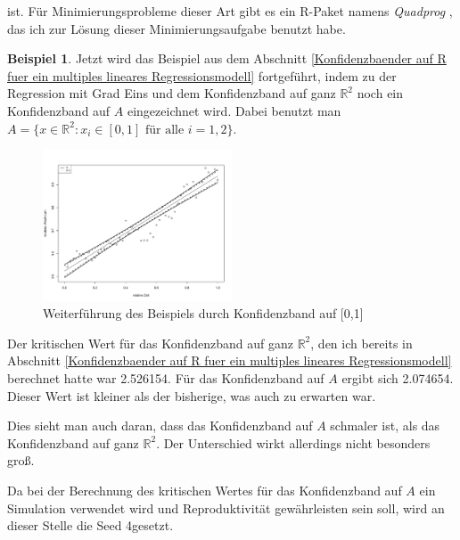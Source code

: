 \documentclass[12pt,a4paper]{article}
\theoremstyle{definition}
\newtheorem{Beispiel}[Definition]{Beispiel}
\theoremstyle{definition}
\theoremstyle{definition}
\newcommand{\cR}{2.526154}
\newcommand{\seedsimulation}{4}
\newcommand{\cA}{2.074654}
\begin{document}
ist. Für Minimierungsprobleme dieser Art gibt es ein R-Paket namens \textit{Quadprog} , das ich zur Lösung dieser Minimierungsaufgabe benutzt habe.

\begin{Beispiel}
Jetzt wird das Beispiel aus dem Abschnitt \ref{Konfidenzbaender auf R fuer ein multiples lineares Regressionsmodell} fortgeführt, indem zu der Regression mit Grad Eins und dem Konfidenzband auf ganz $\mathbb{R}^{2}$ noch ein Konfidenzband auf $A$ eingezeichnet wird. Dabei benutzt man $A = \{x \in \mathbb{R}^2 : x_i \in [0,1] \text{ für alle } i=1, 2 \} $. 


\begin{figure}[H] 
  \centering
     \includegraphics[width=0.5\textwidth]{Bsp-KB-minmax}
  \caption{Weiterführung des Beispiels durch Konfidenzband auf [0,1]}
  \label{KB-minmax-BSP}
\end{figure}

Der kritischen Wert für das Konfidenzband auf ganz $\mathbb{R}^2$, den ich bereits in Abschnitt \ref{Konfidenzbaender auf R fuer ein multiples lineares Regressionsmodell} berechnet hatte war \cR . Für das Konfidenzband auf $A$ ergibt sich \cA . Dieser Wert ist kleiner als der bisherige, was auch zu erwarten war.

Dies sieht man auch daran, dass das Konfidenzband auf $A$ schmaler ist, als das Konfidenzband auf ganz $\mathbb{R}^2$. Der Unterschied wirkt allerdings nicht besonders groß.

Da bei der Berechnung des kritischen Wertes für das Konfidenzband auf $A$ ein Simulation verwendet wird und Reproduktivität gewährleisten sein soll, wird an dieser Stelle die Seed \seedsimulation gesetzt. 

\end{Beispiel}
\end{document}
